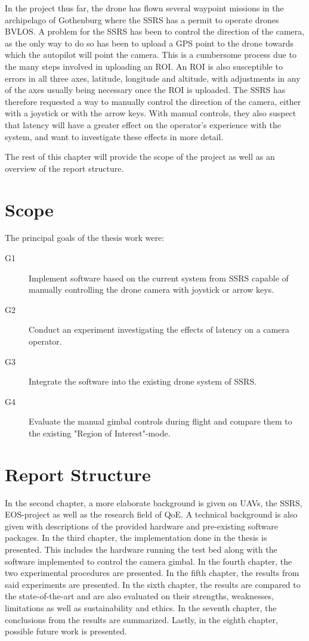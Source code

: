 \documentclass[nofilelist]{cslthse-msc}
\begin{document}
In the project thus far, the drone has flown several waypoint missions in the archipelago of Gothenburg where the SSRS has a permit to operate drones BVLOS. A problem for the SSRS has been to control the direction of the camera, as the only way to do so has been to upload a GPS point to the drone towards which the autopilot will point the camera. This is a cumbersome process due to the many steps involved in uploading an ROI. An ROI is also susceptible to errors in all three axes, latitude, longitude and altitude, with adjustments in any of the axes usually being necessary once the ROI is uploaded. The SSRS has therefore requested a way to manually control the direction of the camera, either with a joystick or with the arrow keys. With manual controls, they also suspect that latency will have a greater effect on the operator's experience with the system, and want to investigate these effects in more detail.

The rest of this chapter will provide the scope of the project as well as an overview of the report structure.

\section{Scope}
\label{sec:scope}
The principal goals of the thesis work were:
\begin{description}
   \item[G1] Implement software based on the current system from SSRS capable of manually controlling the drone camera with joystick or arrow keys. 
   \item[G2] Conduct an experiment investigating the effects of latency on a camera operator. 
   \item[G3] Integrate the software into the existing drone system of SSRS.
   \item[G4] Evaluate the manual gimbal controls during flight and compare them to the existing "Region of Interest"-mode.
\end{description}

\section{Report Structure}
In the second chapter, a more elaborate background is given on UAVs, the SSRS, EOS-project as well as the research field of QoE. A technical background is also given with descriptions of the provided hardware and pre-existing software packages. In the third chapter, the implementation done in the thesis is presented. This includes the hardware running the test bed along with the software implemented to control the camera gimbal. In the fourth chapter, the two experimental procedures are presented. In the fifth chapter, the results from said experiments are presented. In the sixth chapter, the results are compared to the state-of-the-art and are also evaluated on their strengths, weaknesses, limitations as well as sustainability and ethics. In the seventh chapter, the conclusions from the results are summarized. Lastly, in the eighth chapter, possible future work is presented.
\end{document}
